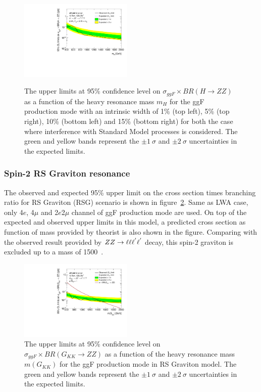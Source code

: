 \begin{figure}[h]
\begin{center}
    \includegraphics[width=0.48\textwidth]{figures/HMHZZ/results/Limits_LWA_withInt_15.pdf} \\
    \end{center}
    \caption{The upper limits at 95\% confidence level on $\sigma_{ggF} \times BR(H\rightarrow ZZ)$
    as a function of the heavy resonance mass $m_{H}$ for the ggF production mode with an intrinsic width of 1\% (top left), 5\% (top right), 10\% (bottom left) and 15\% (bottom right) for both the case where interference with Standard Model processes is considered.
    The green and yellow bands represent the $\pm 1~\sigma$ and $\pm 2~\sigma$ uncertainties in the expected limits.
  }
    \label{fig:LWAlimits_ggF_201518_withInt}
\end{figure}

\subsubsection{Spin-2 RS Graviton resonance}

The observed and expected 95\% upper limit on the cross section times branching ratio for RS Graviton (RSG) scenario is shown in figure~\ref{fig:RSGlimits_ggF_201518}.
Same as LWA case, only 4$e$, 4$\mu$ and 2$e$2$\mu$ channel of ggF production mode are used.
On top of the expected and observed upper limits in this model, a predicted cross section as function of mass provided by theorist is also shown in the figure.
Comparing with the observed result provided by $ZZ \rightarrow \ell\ell\ell^{'}\ell^{'}$ decay, this spin-2 graviton is excluded up to a mass of 1500~\gev.

\begin{figure}[h]
    \begin{center}
    \includegraphics[width=0.48\textwidth]{figures/HMHZZ/results/Limits_RSG.pdf}
    \end{center}
    \caption{The upper limits at 95\% confidence level on $\sigma_{ggF} \times BR(G_{KK}\rightarrow ZZ)$
    as a function of the heavy resonance mass $m(G_{KK})$ for the ggF production mode in RS Graviton model.
    The green and yellow bands represent the $\pm 1~\sigma$ and $\pm 2~\sigma$ uncertainties in the expected limits.
  }
    \label{fig:RSGlimits_ggF_201518}
\end{figure}

